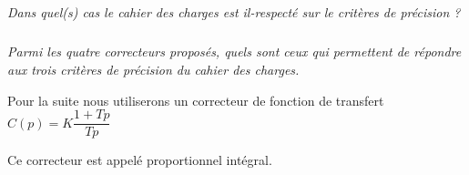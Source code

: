 \documentclass[10pt]{article}
\begin{document}
\subparagraph{}
\textit{Dans quel(s) cas le cahier des charges est il-respecté sur le critères de précision ?}


\subparagraph{}
\textit{Parmi les quatre correcteurs proposés,
quels sont ceux qui permettent de répondre aux trois critères de précision du cahier des charges.}

Pour la suite nous utiliserons un correcteur de fonction de transfert  $C(p)=K\dfrac{1+Tp}{Tp}$

\begin{rem}
Ce correcteur est appelé proportionnel intégral.
\end{rem}
\end{document}
